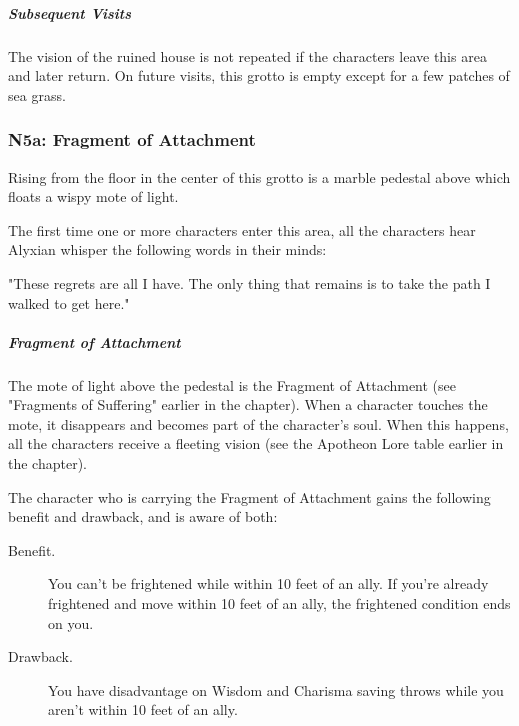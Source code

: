 \documentclass[10pt,a4paper,twoside,fancy,bg=print,twocolumn,openany,nodeprecatedcode]{dndbook}
\begin{document}
\subparagraph{Subsequent Visits}
The vision of the ruined house is not repeated if the characters leave this area and later return. On future visits, this grotto is empty except for a few patches of sea grass.

\subsubsection{N5a: Fragment of Attachment}
\begin{DndReadAloud}{}
Rising from the floor in the center of this grotto is a marble pedestal above which floats a wispy mote of light.

\end{DndReadAloud}

The first time one or more characters enter this area, all the characters hear Alyxian whisper the following words in their minds:

\begin{DndReadAloud}{}
"These regrets are all I have. The only thing that remains is to take the path I walked to get here."

\end{DndReadAloud}

\subparagraph{Fragment of Attachment}
The mote of light above the pedestal is the Fragment of Attachment (see "Fragments of Suffering" earlier in the chapter). When a character touches the mote, it disappears and becomes part of the character's soul. When this happens, all the characters receive a fleeting vision (see the Apotheon Lore table earlier in the chapter).

The character who is carrying the Fragment of Attachment gains the following benefit and drawback, and is aware of both:

\begin{DndSidebar}[float=!b]{}

\begin{description}
\item[Benefit.]
You can't be frightened while within 10 feet of an ally. If you're already frightened and move within 10 feet of an ally, the frightened condition ends on you.
\item[Drawback.]
You have disadvantage on Wisdom and Charisma saving throws while you aren't within 10 feet of an ally.
\end{description}



\end{DndSidebar}
\end{document}
